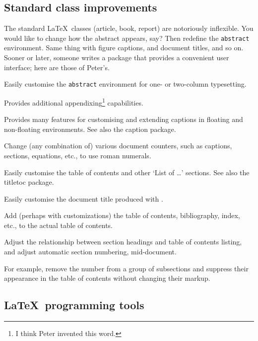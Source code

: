 \documentclass[final]{ltugboat}
\begin{document}
\subsection{Standard class improvements}

The standard \LaTeX\ classes (\textsf{article}, \textsf{book}, \textsf{report}) are notoriously inflexible. You would like to change how the abstract appears, say? Then redefine the \texttt{abstract} environment. Same thing with figure captions, and document titles, and so on. Sooner or later, someone writes a package that provides a convenient user interface; here are those of Peter's.

\begin{description}[font=\normalfont\sffamily]
\item [abstract] Easily customise the \texttt{abstract} environment for one- or two-column typesetting.
\item [appendix] Provides additional appendixing\footnote{I think Peter invented this word.} capabilities.
\item [ccaption] Provides many features for customising and extending captions in floating and non-floating environments. See also the \textsf{caption} package.
\item [romannum] Change (any combination of) various document counters, such as captions, sections, equations, etc., to use roman numerals.
\item [tocloft] Easily customise the table of contents and other `List of \dots' sections. See also the \textsf{titletoc} package.
\item [titling] Easily customise the document title produced with .
\item [tocbibind] Add (perhaps with customizations) the table of contents, bibliography, index, etc., to the actual table of contents.
\item [tocvsec2] Adjust the relationship between section headings and table of contents listing, and adjust automatic section numbering, mid-document.

For example, remove the number from a group of subsections and suppress their appearance in the table of contents without changing their markup.
\end{description}

\subsection{\LaTeX\ programming tools}
\end{document}
